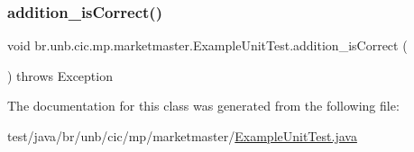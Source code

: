 \subsubsection{\texorpdfstring{addition\+\_\+is\+Correct()}{addition\_isCorrect()}}
{\footnotesize\ttfamily void br.\+unb.\+cic.\+mp.\+marketmaster.\+Example\+Unit\+Test.\+addition\+\_\+is\+Correct (\begin{DoxyParamCaption}{ }\end{DoxyParamCaption}) throws Exception}



The documentation for this class was generated from the following file\+:\begin{DoxyCompactItemize}
\item 
test/java/br/unb/cic/mp/marketmaster/\mbox{\hyperlink{ExampleUnitTest_8java}{Example\+Unit\+Test.\+java}}\end{DoxyCompactItemize}
